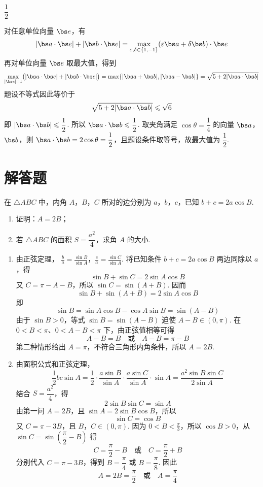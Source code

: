 \begin{answer}
\(\dfrac12\)
\end{answer}

\begin{solution}
对任意单位向量 \(\bs e\)，有
\[
|\bs a\cdot\bs e|+|\bs b\cdot\bs e|
=\max_{\varepsilon,\delta\in\{1,-1\}}
(\varepsilon\bs a+\delta\bs b)\cdot\bs e
\]
再对单位向量 \(\bs e\) 取最大值，得到
\[
\max_{|\bs e|=1}\bigl(|\bs a\cdot\bs e|+|\bs b\cdot\bs e|\bigr)
=\max\{|\bs a+\bs b|,|\bs a-\bs b|\}
=\sqrt{5+2|\bs a\cdot\bs b|}
\]
题设不等式因此等价于
\[
\sqrt{5+2|\bs a\cdot\bs b|}\leqslant\sqrt6
\]
即 \(|\bs a\cdot\bs b|\leqslant\dfrac12\). 所以 \(\bs a\cdot\bs b\leqslant\dfrac12\). 取夹角满足 \(\cos\theta=\dfrac14\) 的向量 \(\bs a\)，\(\bs b\)，则 \(\bs a\cdot\bs b=2\cos\theta=\dfrac12\)，且题设条件取等号，故最大值为 \(\dfrac12\).
\end{solution}

\section{解答题}

\begin{problem}
在 \( \triangle ABC \) 中，内角 \(A\)，\(B\)，\(C\) 所对的边分别为 \(a\)，\(b\)，\(c\)，已知 \( b+c=2a\cos B \).

\begin{enumerate}
\item 证明：\( A=2B \)；
\item 若 \( \triangle ABC \) 的面积 \( S=\dfrac{a^2}{4} \)，求角 \(A\) 的大小.
\end{enumerate}
\end{problem}

\begin{solution}
\begin{enumerate}
\item 由正弦定理，
\(\frac{b}{a}=\frac{\sin B}{\sin A}\)，\(\frac{c}{a}=\frac{\sin C}{\sin A}\).
将已知条件 \(b+c=2a\cos B\) 两边同除以 \(a\)，得
\[
\sin B+\sin C=2\sin A\cos B
\]
又 \(C=\pi-A-B\)，所以 \(\sin C=\sin(A+B)\). 因而
\[
\sin B+\sin(A+B)=2\sin A\cos B
\]
即
\[
\sin B=\sin A\cos B-\cos A\sin B=\sin(A-B)
\]
由于 \(\sin B>0\)，等式 \(\sin B=\sin(A-B)\) 迫使 \(A-B\in(0,\pi)\). 在 \(0<B<\pi\)、\(0<A-B<\pi\) 下，由正弦值相等可得
\[
A-B=B\quad\text{或}\quad A-B=\pi-B
\]
第二种情形给出 \(A=\pi\)，不符合三角形内角条件，所以 \(A=2B\).

\item 由面积公式和正弦定理，
\[
\frac12bc\sin A
=\frac12\cdot\frac{a\sin B}{\sin A}\cdot\frac{a\sin C}{\sin A}\cdot\sin A
=\frac{a^2\sin B\sin C}{2\sin A}
\]
结合 \(S=\dfrac{a^2}{4}\)，得
\[
2\sin B\sin C=\sin A
\]
由第一问 \(A=2B\)，且 \(\sin A=2\sin B\cos B\)，所以
\[
\sin C=\cos B
\]
又 \(C=\pi-3B\)，且 \(B\)，\(C\in(0,\pi)\). 因为 \(0<B<\frac{\pi}{3}\)，所以 \(\cos B>0\)，从
\(\sin C=\sin\left(\dfrac\pi2-B\right)\) 得
\[
C=\frac\pi2-B\quad\text{或}\quad C=\frac\pi2+B
\]
分别代入 \(C=\pi-3B\)，得到 \(B=\dfrac\pi4\) 或 \(B=\dfrac\pi8\). 因此
\[
A=2B=\frac\pi2\quad\text{或}\quad A=\frac\pi4
\]
\end{enumerate}
\end{solution}

